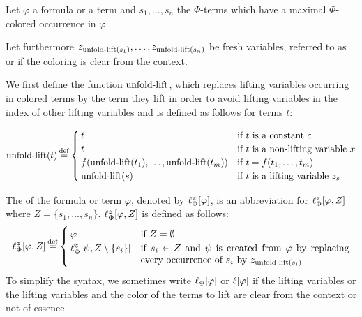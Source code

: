 \begin{defi}[Lifting]
\newcommand{\colterm}[1]{s_{#1}}
Let $\varphi$ a formula or a term and $\colterm{1}, \dotsc, \colterm{n}$ the $\Phi$-terms which have a maximal $\Phi$-colored occurrence in $\varphi$.

	Let furthermore $z_{\expa(\colterm{1})}, \ldots, z_{\expa(\colterm{n})}$ be fresh variables, referred to as  or  if the coloring is clear from the context.

	We first define the function $\operatorname{unfold-lift}$, which replaces lifting variables occurring in colored terms by the term they lift in order to avoid lifting variables in the index of other lifting variables and is defined as follows for terms $t$:
	\medskip

	\begin{adjustwidth}{-1em}{}
		\noindent $
		\expa(t) \defeq \begin{cases}
			t & \text{if $t$ is a constant $c$} \\
			t & \text{if $t$ is a non-lifting variable $x$} \\
			f(\expa(t_1),\dots, \expa(t_m)) & \text{if $t=f(t_1, \dots, t_m)$} \\
			\expa(s) & \text{if $t$ is a lifting variable $z_s$}
	\end{cases}
	$
	\end{adjustwidth}
	\medskip

	The  of the formula or term $\varphi$, denoted by $\ell_{\Phi}^{z}[\varphi]$, is an abbreviation for 
	$\ell_{\Phi}^{z}[\varphi, Z]$ where $Z = \{ \colterm{1}, \dotsc, \colterm{n} \}$.
		$\ell_{\Phi}^{z}[\varphi, Z]$ is defined as follows:
	\[
		\lifphi{\varphi, Z} \defeq
		\begin{cases}
			\varphi & \text{if $Z = \emptyset$} \\
			\lifphi{\psi, Z\setminus\{\colterm{i}\}} & \parbox[t]{0.622\linewidth}{if $\colterm{i} \in Z$  and $\psi$ is created from $\varphi$ by replacing every occurrence of $\colterm{i}$ by $z_{\expa(\colterm{i})}$} 
		\end{cases}
	\]
	To simplify the syntax, we sometimes write $\ell_{\Phi}[\varphi]$ or $\ell[\varphi]$ if the lifting variables or the lifting variables and the color of the terms to lift are clear from the context or not of essence.
\end{defi}

